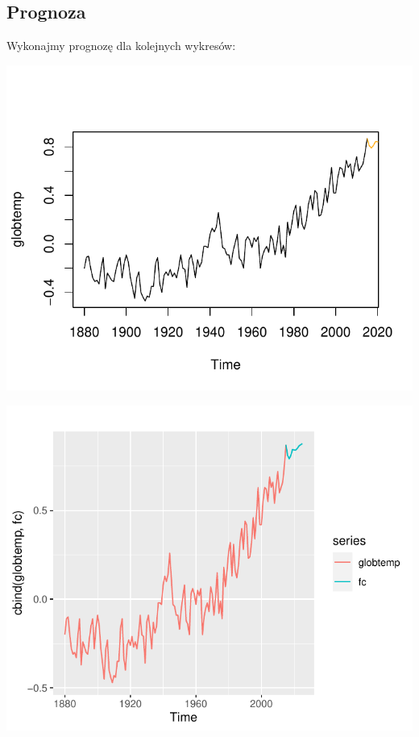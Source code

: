 \documentclass[12pt, a4paper]{article}\usepackage[]{graphicx}\usepackage[]{color}
\makeatletter
\def\maxwidth{ %
  \ifdim\Gin@nat@width>\linewidth
    \linewidth
  \else
    \Gin@nat@width
  \fi
}
\newenvironment{knitrout}{}{} %
\makeatother
\begin{document}
\subsection{Prognoza}

Wykonajmy prognozę dla kolejnych wykresów:

\begin{knitrout}
\color{fgcolor}

{\centering \includegraphics[width=\maxwidth]{figure/unnamed-chunk-16-1} 

}




{\centering \includegraphics[width=\maxwidth]{figure/unnamed-chunk-16-2} 

}
\end{knitrout}
\end{document}
